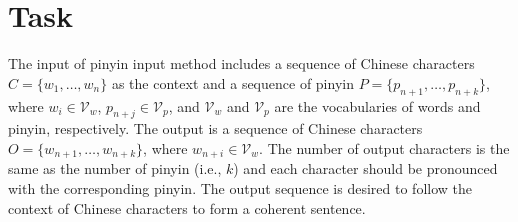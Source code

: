 \section{Task}


The input of pinyin input method includes a sequence of Chinese characters $C=\{w_1,\dots,w_n\}$ as the context and a sequence of pinyin $P=\{p_{n+1},\dots,p_{n+k}\}$, where $w_i\in\mathcal{V}_w$, $p_{n+j}\in\mathcal{V}_p$, and $\mathcal{V}_w$ and $\mathcal{V}_p$ are the vocabularies of words and pinyin, respectively.
The output is a sequence of Chinese characters $O=\{w_{n+1},\dots,w_{n+k}\}$, where  $w_{n+i}\in\mathcal{V}_w$.
The number of output characters is the same as the number of pinyin (i.e., $k$) and each character should be pronounced with the corresponding pinyin. The output sequence is desired to follow the context of Chinese characters to form a coherent sentence. 
